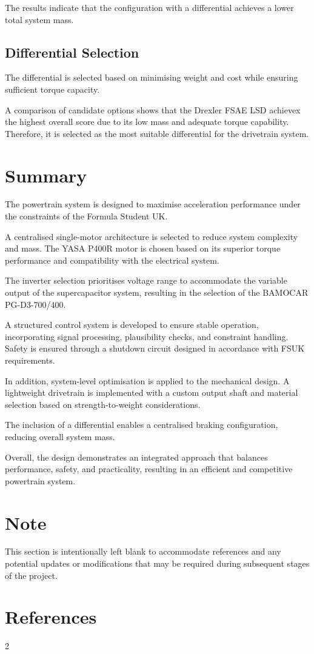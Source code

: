 \documentclass[11pt, a4paper]{report}
\numberwithin{equation}{section}
\newcommand{\compactbib}{%
  \vspace{-16pt}%
  \enlargethispage{20pt}%
  \section*{References}%
  \vspace{-33pt}%
  \begingroup
    \begin{singlespace}%
      \begin{multicols}{2}%
        \scriptsize
        \setlength{\bibitemsep}{0pt}%
        \printbibliography[heading=none]%
      \end{multicols}%
    \end{singlespace}%
  \endgroup
}
\begin{document}
The results indicate that the configuration with a differential achieves a lower total system mass.

\subsection{Differential Selection}

The differential is selected based on minimising weight and cost while ensuring sufficient torque capacity.

A comparison of candidate options shows that the Drexler FSAE LSD \cite{Drexler_FSAE_LSD_data_sheet}
achievex the highest overall score due to its low mass and adequate torque capability. Therefore, it is selected as the most suitable differential for the drivetrain system.

\section{Summary}

The powertrain system is designed to maximise acceleration performance under the constraints of the Formula Student UK.

A centralised single-motor architecture is selected to reduce system complexity and mass. The YASA P400R motor is chosen based on its superior torque performance and compatibility with the electrical system.

The inverter selection prioritises voltage range to accommodate the variable output of the supercapacitor system, resulting in the selection of the BAMOCAR PG-D3-700/400.

A structured control system is developed to ensure stable operation, incorporating signal processing, plausibility checks, and constraint handling. Safety is ensured through a shutdown circuit designed in accordance with FSUK requirements.

In addition, system-level optimisation is applied to the mechanical design. A lightweight drivetrain is implemented with a custom output shaft and material selection based on strength-to-weight considerations.

The inclusion of a differential enables a centralised braking configuration, reducing overall system mass.

Overall, the design demonstrates an integrated approach that balances performance, safety, and practicality, resulting in an efficient and competitive powertrain system.

\section*{Note}

This section is intentionally left blank to accommodate references and any potential updates or modifications that may be required during subsequent stages of the project.

\compactbib
\end{document}
